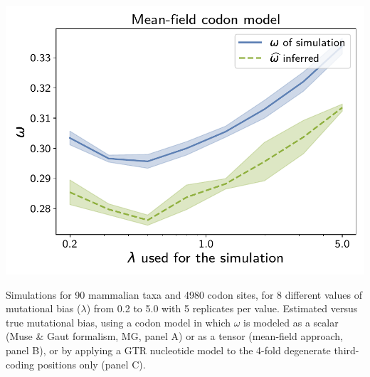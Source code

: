 \documentclass{article}
\begin{document}
\begin{center}
\begin{minipage}{0.325\linewidth}
        \includegraphics[width=\linewidth, page=1]{inference_supp_mat/MammalsExons10Mu1.0_omega_MF.pdf}
    \end{minipage}
\end{center}
Simulations for 90 mammalian taxa and 4980 codon sites, for 8 different values of mutational bias ($\lambda$) from 0.2 to 5.0 with 5 replicates per value.
Estimated versus true mutational bias, using a codon model in which $\omega$ is modeled as a scalar (Muse \& Gaut formalism, MG, panel A) or as a tensor (mean-field approach, panel B), or by applying a GTR nucleotide model to the 4-fold degenerate third-coding positions only (panel C).
\end{document}

